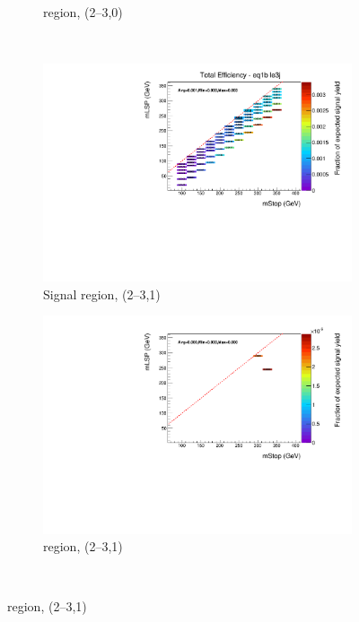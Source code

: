 \begin{figure}[p]
\begin{subfigure}[b]{0.47\textwidth}
    \caption{\mj region, (2--3,0)}
    \label{fig:t2cc_mu_eff_le3j_0b}
  \end{subfigure} \\
  \begin{subfigure}[b]{0.47\textwidth}
    \includegraphics[width=\textwidth]{Figs/sms/t2cc/v37/effs/T2cc_had_eff_maps_eq1b_le3j_SITV.pdf}
    \caption{Signal region, (2--3,1)}
    \label{fig:t2cc_sig_eff_le3j_1b}
  \end{subfigure}
  \begin{subfigure}[b]{0.47\textwidth}
    \includegraphics[width=\textwidth]{Figs/sms/t2cc/v37/effs/T2cc_muon_eff_maps_eq1b_le3j_SITV.pdf}
    \caption{\mj region, (2--3,1)}
    \label{fig:t2cc_mu_eff_le3j_1b}
  \end{subfigure} \\

\end{figure}
